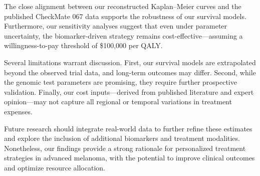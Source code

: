 \documentclass[preprint, 3p,
authoryear]{elsarticle} %
\begin{document}
The close alignment between our reconstructed Kaplan--Meier curves and
the published CheckMate 067 data supports the robustness of our survival
models. Furthermore, our sensitivity analyses suggest that even under
parameter uncertainty, the biomarker-driven strategy remains
cost-effective---assuming a willingness-to-pay threshold of \$100,000
per QALY.

Several limitations warrant discussion. First, our survival models are
extrapolated beyond the observed trial data, and long-term outcomes may
differ. Second, while the genomic test parameters are promising, they
require further prospective validation. Finally, our cost
inputs---derived from published literature and expert opinion---may not
capture all regional or temporal variations in treatment expenses.

Future research should integrate real-world data to further refine these
estimates and explore the inclusion of additional biomarkers and
treatment modalities. Nonetheless, our findings provide a strong
rationale for personalized treatment strategies in advanced melanoma,
with the potential to improve clinical outcomes and optimize resource
allocation.
\end{document}
